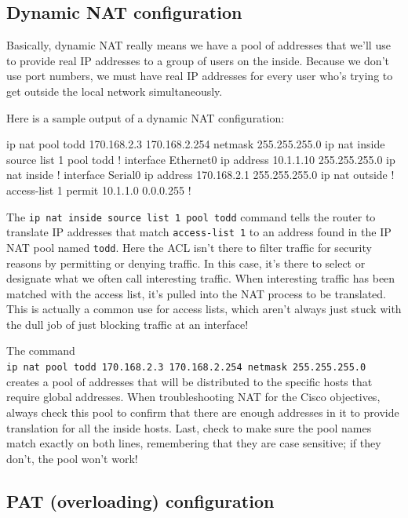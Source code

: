 \subsection{Dynamic NAT configuration}

Basically, dynamic NAT really means we have a pool of addresses that
we'll use to provide real IP addresses to a group of users on the
inside. Because we don't use port numbers, we must have real IP
addresses for every user who's trying to get outside the local network
simultaneously.

Here is a sample output of a dynamic NAT configuration:

\begin{cli}
ip nat pool todd 170.168.2.3 170.168.2.254
netmask 255.255.255.0
ip nat inside source list 1 pool todd
!
interface Ethernet0
 ip address 10.1.1.10 255.255.255.0
 ip nat inside
!
interface Serial0
 ip address 170.168.2.1 255.255.255.0
 ip nat outside
!
access-list 1 permit 10.1.1.0 0.0.0.255
!
\end{cli}

The \texttt{ip\ nat\ inside\ source\ list\ 1\ pool\ todd} command tells
the router to translate IP addresses that match \texttt{access-list\ 1}
to an address found in the IP NAT pool named \texttt{todd}. Here the ACL
isn't there to filter traffic for security reasons by permitting or
denying traffic. In this case, it's there to select or designate what we
often call interesting traffic. When interesting traffic has been
matched with the access list, it's pulled into the NAT process to be
translated. This is actually a common use for access lists, which aren't
always just stuck with the dull job of just blocking traffic at an
interface!

The command
\texttt{ip\ nat\ pool\ todd\ 170.168.2.3\ 170.168.2.254\ netmask\ 255.255.255.0}
creates a pool of addresses that will be distributed to the specific
hosts that require global addresses. When troubleshooting NAT for the
Cisco objectives, always check this pool to confirm that there are
enough addresses in it to provide translation for all the inside hosts.
Last, check to make sure the pool names match exactly on both lines,
remembering that they are case sensitive; if they don't, the pool won't
work!



\subsection{PAT (overloading) configuration}

